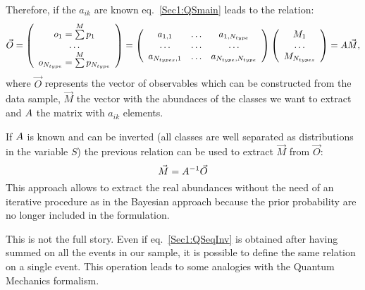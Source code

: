 Therefore, if the $a_{ik}$ are known eq.~\ref{Sec1:QSmain} leads to the
relation:
\begin{equation}
\label{Sec1:QSformula}
\vec{O} =
 \left(
\begin{array}{c}
o_1 = \sum\limits^{M} p_{1}\\
\ldots \\
o_{N_{type}}=\sum\limits^{M} p_{N_{type}}
\end{array}
\right) =
\left(
\begin{array}{ccc}
a_{1,1} & \ldots & a_{1,N_{type}} \\
\ldots & \ldots & \ldots \\
a_{N_{types},1} & \ldots & a_{N_{type},N_{type}}
\end{array}
\right)
\left(
\begin{array}{c}
M_{1}\\
\ldots \\
M_{N_{types}}
\end{array}
\right) =
\boldmath{A} \vec{M},
\end{equation}
where $\vec{O}$ represents the vector of observables which can be constructed from the data
sample, $\vec{M}$ the vector with the abundaces of the classes we want to
extract and $\boldmath{A}$ the matrix with $a_{ik}$ elements.

If $\boldmath{A}$ is known and can be inverted (all classes are
well separated as distributions in the variable $S$) the previous relation can
be used to extract $\vec{M}$ from $\vec{O}$:
\begin{equation}
\label{Sec1:QSeqInv}
\vec{M} = \boldmath{A^{-1}} \vec{O}
\end{equation}
This approach allows to extract the real abundances without the need of
an iterative procedure as in the Bayesian approach because the prior
probability are no longer included in the formulation.

This is not the full story. Even if eq.~\ref{Sec1:QSeqInv} is
obtained after having summed on all the events in our sample, it is possible
to define the same relation on a single event. This operation leads to some
analogies with the Quantum Mechanics formalism.


